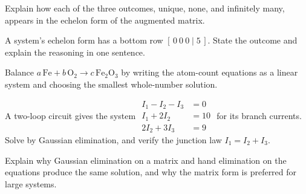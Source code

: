 \documentclass[12pt]{book}
\begin{document}
\begin{exercises}
\item Explain how each of the three outcomes, unique, none, and infinitely many,
appears in the echelon form of the augmented matrix.

\item A system's echelon form has a bottom row $[\,0\ 0\ 0\mid 5\,]$. State the
outcome and explain the reasoning in one sentence.

\item Balance $a\,\mathrm{Fe}+b\,\mathrm{O_2}\to c\,\mathrm{Fe_2O_3}$ by writing the
atom-count equations as a linear system and choosing the smallest whole-number
solution.

\item A two-loop circuit gives the system
$\begin{aligned}I_1-I_2-I_3&=0\\ I_1+2I_2&=10\\ 2I_2+3I_3&=9\end{aligned}$
for its branch currents. Solve by Gaussian elimination, and verify the junction law
$I_1=I_2+I_3$.

\item Explain why Gaussian elimination on a matrix and hand elimination on the
equations produce the same solution, and why the matrix form is preferred for large
systems.
\end{exercises}
\end{document}
